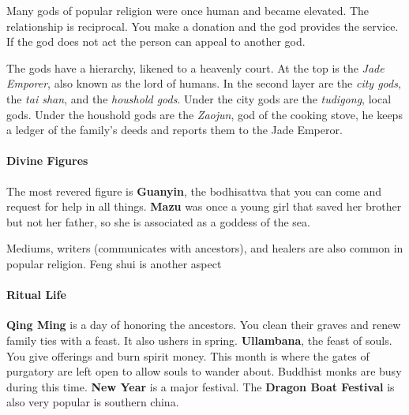 \documentclass{article}
\begin{document}
Many gods of popular religion were once human and became elevated. The relationship is reciprocal. You make a donation and the god provides the service. If the god does not act the person can appeal to another god.

The gods have a hierarchy, likened to a heavenly court. At the top is the \emph{Jade Emporer}, also known as the lord of humans. In the second layer are the \emph{city gods}, the \emph{tai shan}, and the \emph{houshold gods}. Under the city gods are the \emph{tudigong}, local gods. Under the houshold gods are the \emph{Zaojun}, god of the cooking stove, he keeps a ledger of the family's deeds and reports them to the Jade Emperor.

\paragraph{Divine Figures}
\label{par:divine_figures}
The most revered figure is \textbf{Guanyin}, the bodhisattva that you can come and request for help in all things. \textbf{Mazu} was once a young girl that saved her brother but not her father, so she is associated as a goddess of the sea.

Mediums, writers (communicates with ancestors), and healers are also common in popular religion. Feng shui is another aspect

\paragraph{Ritual Life}
\label{par:ritual_lif}
\textbf{Qing Ming} is a day of honoring the ancestors. You clean their graves and renew family ties with a feast. It also ushers in spring. \textbf{Ullambana}, the feast of souls. You give offerings and burn spirit money. This month is where the gates of purgatory are left open to allow souls to wander about. Buddhist monks are busy during this time. \textbf{New Year} is a major festival. The \textbf{Dragon Boat Festival} is also very popular is southern china.
\end{document}
